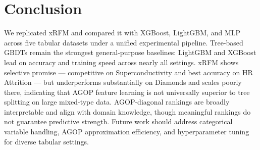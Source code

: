 
\section{Conclusion}

We replicated xRFM and compared it with XGBoost, LightGBM, and MLP across five tabular datasets under a unified experimental pipeline. Tree-based GBDTs remain the strongest general-purpose baselines: LightGBM and XGBoost lead on accuracy and training speed across nearly all settings. xRFM shows selective promise — competitive on Superconductivity and best accuracy on HR Attrition — but underperforms substantially on Diamonds and scales poorly there, indicating that AGOP feature learning is not universally superior to tree splitting on large mixed-type data. AGOP-diagonal rankings are broadly interpretable and align with domain knowledge, though meaningful rankings do not guarantee predictive strength. Future work should address categorical variable handling, AGOP approximation efficiency, and hyperparameter tuning for diverse tabular settings.

